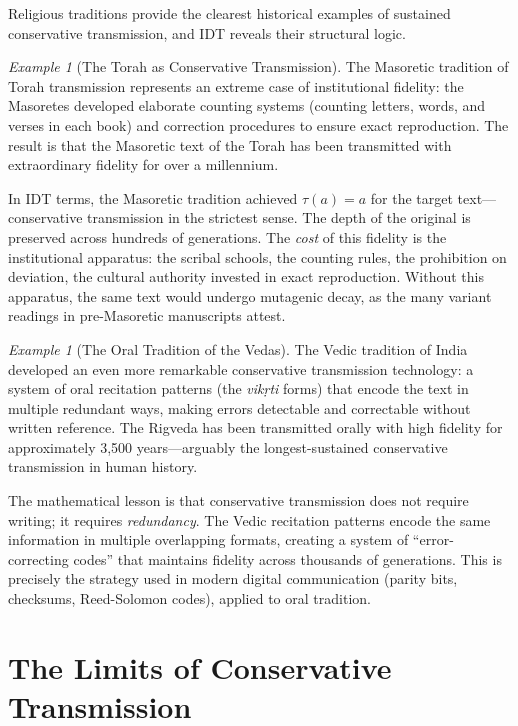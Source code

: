 \documentclass[11pt,openany]{book}
\theoremstyle{definition}
\theoremstyle{plain}
\theoremstyle{remark}
\newtheorem{example}[axiom]{Example}
\newcommand{\transmit}{\tau}                 %
\begin{document}
Religious traditions provide the clearest historical examples of sustained conservative transmission, and IDT reveals their structural logic.

\begin{example}[The Torah as Conservative Transmission]
The Masoretic tradition of Torah transmission represents an extreme case of institutional fidelity: the Masoretes developed elaborate counting systems (counting letters, words, and verses in each book) and correction procedures to ensure exact reproduction. The result is that the Masoretic text of the Torah has been transmitted with extraordinary fidelity for over a millennium.

In IDT terms, the Masoretic tradition achieved $\transmit(a) = a$ for the target text---conservative transmission in the strictest sense. The depth of the original is preserved across hundreds of generations. The \emph{cost} of this fidelity is the institutional apparatus: the scribal schools, the counting rules, the prohibition on deviation, the cultural authority invested in exact reproduction. Without this apparatus, the same text would undergo mutagenic decay, as the many variant readings in pre-Masoretic manuscripts attest.
\end{example}

\begin{example}[The Oral Tradition of the Vedas]
The Vedic tradition of India developed an even more remarkable conservative transmission technology: a system of oral recitation patterns (the \emph{vikṛti} forms) that encode the text in multiple redundant ways, making errors detectable and correctable without written reference. The Rigveda has been transmitted orally with high fidelity for approximately 3,500 years---arguably the longest-sustained conservative transmission in human history.

The mathematical lesson is that conservative transmission does not require writing; it requires \emph{redundancy}. The Vedic recitation patterns encode the same information in multiple overlapping formats, creating a system of ``error-correcting codes'' that maintains fidelity across thousands of generations. This is precisely the strategy used in modern digital communication (parity bits, checksums, Reed-Solomon codes), applied to oral tradition.
\end{example}

\section{The Limits of Conservative Transmission}
\end{document}
